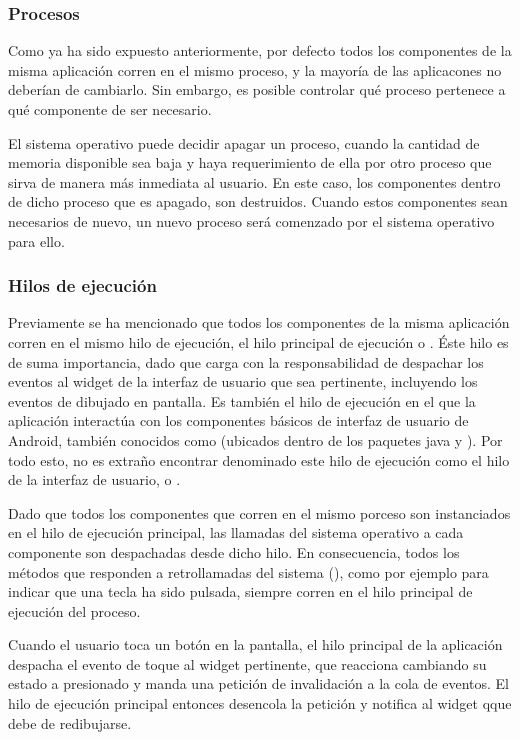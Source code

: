\subsubsection{Procesos}

Como ya ha sido expuesto anteriormente, por defecto todos los componentes de la misma aplicación corren en el mismo proceso, y la mayoría de las aplicacones no deberían de cambiarlo. Sin embargo, es posible controlar qué proceso pertenece a qué componente de ser necesario.

El sistema operativo puede decidir apagar un proceso, cuando la cantidad de memoria disponible sea baja y haya requerimiento de ella por otro proceso que sirva de manera más inmediata al usuario. En este caso, los componentes dentro de dicho proceso que es apagado, son destruidos. Cuando estos componentes sean necesarios de nuevo, un nuevo proceso será comenzado por el sistema operativo para ello.

\subsubsection{Hilos de ejecución}

Previamente se ha mencionado que todos los componentes de la misma aplicación corren en el mismo hilo de ejecución, el hilo principal de ejecución o . Éste hilo es de suma importancia, dado que carga con la responsabilidad de despachar los eventos al widget de la interfaz de usuario que sea pertinente, incluyendo los eventos de dibujado en pantalla. Es también el hilo de ejecución en el que la aplicación interactúa con los componentes básicos de interfaz de usuario de Android, también conocidos como  (ubicados dentro de los paquetes java  y ). Por todo esto, no es extraño encontrar denominado este hilo de ejecución como el hilo de la interfaz de usuario, o .

Dado que todos los componentes que corren en el mismo porceso son instanciados en el hilo de ejecución principal, las llamadas del sistema operativo a cada componente son despachadas desde dicho hilo. En consecuencia, todos los métodos que responden a retrollamadas del sistema (), como por ejemplo para indicar que una tecla ha sido pulsada, siempre corren en el hilo principal de ejecución del proceso.

Cuando el usuario toca un botón en la pantalla, el hilo principal de la aplicación despacha el evento de toque al widget pertinente, que reacciona cambiando su estado a presionado y manda una petición de invalidación a la cola de eventos. El hilo de ejecución principal entonces desencola la petición y notifica al widget qque debe de redibujarse.

